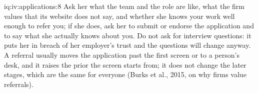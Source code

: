 \begin{solution}{iq:iv:applications:8}
Ask her what the team and the role are like, what the firm values that its website does not say, and whether
she knows your work well enough to refer you; if she does, ask her to submit or endorse the application and
to say what she actually knows about you. Do not ask for interview questions: it puts her in breach of her
employer's trust and the questions will change anyway. A referral usually moves the application past the
first screen or to a person's desk, and it raises the prior the screen starts from; it does not change the
later stages, which are the same for everyone (Burks et al., 2015, on why firms value referrals).
\end{solution}
